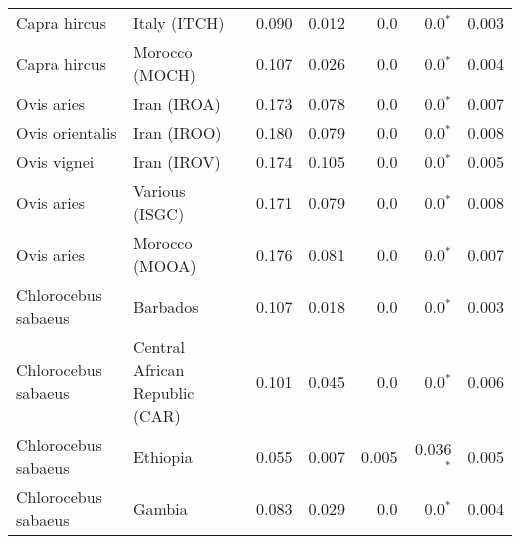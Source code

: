 \begin{center}
\begin{adjustbox}{width = 1\textwidth}
\begin{tabular}{|l|l|r|r|r|r|r|}
        Capra hircus &                    Italy (ITCH) &                 0.090 &                                0.012 &                  0.0 &                             0.0$\bm{^*}$ &              0.003 \\
        Capra hircus &                  Morocco (MOCH) &                 0.107 &                                0.026 &                  0.0 &                             0.0$\bm{^*}$ &              0.004 \\
          Ovis aries &                     Iran (IROA) &                 0.173 &                                0.078 &                  0.0 &                             0.0$\bm{^*}$ &              0.007 \\
     Ovis orientalis &                     Iran (IROO) &                 0.180 &                                0.079 &                  0.0 &                             0.0$\bm{^*}$ &              0.008 \\
         Ovis vignei &                     Iran (IROV) &                 0.174 &                                0.105 &                  0.0 &                             0.0$\bm{^*}$ &              0.005 \\
          Ovis aries &                  Various (ISGC) &                 0.171 &                                0.079 &                  0.0 &                             0.0$\bm{^*}$ &              0.008 \\
          Ovis aries &                  Morocco (MOOA) &                 0.176 &                                0.081 &                  0.0 &                             0.0$\bm{^*}$ &              0.007 \\
 Chlorocebus sabaeus &                        Barbados &                 0.107 &                                0.018 &                  0.0 &                             0.0$\bm{^*}$ &              0.003 \\
 Chlorocebus sabaeus &  Central African Republic (CAR) &                 0.101 &                                0.045 &                  0.0 &                             0.0$\bm{^*}$ &              0.006 \\
 Chlorocebus sabaeus &                        Ethiopia &                 0.055 &                                0.007 &                0.005 &                           0.036$\bm{^*}$ &              0.005 \\
 Chlorocebus sabaeus &                          Gambia &                 0.083 &                                0.029 &                  0.0 &                             0.0$\bm{^*}$ &              0.004 \\

\end{tabular}
\end{adjustbox}
\end{center}
